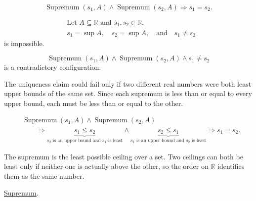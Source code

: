 \begin{remark*}
\[
\operatorname{Supremum}(s_1,A)\land \operatorname{Supremum}(s_2,A)
\Longrightarrow
s_1=s_2.
\]
\end{remark*}

\begin{remark*}
\[
\begin{aligned}
&\text{Let }A\subseteq\mathbb{R}\text{ and }s_1,s_2\in\mathbb{R}.\\
&s_1=\sup A,\quad s_2=\sup A,\quad\text{and}\quad s_1\ne s_2
\end{aligned}
\]
is impossible.
\end{remark*}

\begin{remark*}
\[
\operatorname{Supremum}(s_1,A)\land \operatorname{Supremum}(s_2,A)\land s_1\ne s_2
\]
is a contradictory configuration.
\end{remark*}

\begin{remark*}
The uniqueness claim could fail only if two different real numbers were both least upper bounds of the same set. Since each supremum is less than or equal to every upper bound, each must be less than or equal to the other.
\end{remark*}

\begin{remark*}
\[
\begin{aligned}
&\operatorname{Supremum}(s_1,A)\land \operatorname{Supremum}(s_2,A)\\
&\qquad\Longrightarrow
\underbrace{s_1\le s_2}_{s_2\text{ is an upper bound and }s_1\text{ is least}}
\land
\underbrace{s_2\le s_1}_{s_1\text{ is an upper bound and }s_2\text{ is least}}
\Longrightarrow
s_1=s_2.
\end{aligned}
\]
\end{remark*}

\begin{remark*}[Interpretation]
The supremum is the least possible ceiling over a set. Two ceilings can both be least only if neither one is actually above the other, so the order on $\mathbb{R}$ identifies them as the same number.
\end{remark*}

\begin{remark*}[Dependencies]
\hyperref[def:supremum]{Supremum}.
\end{remark*}


